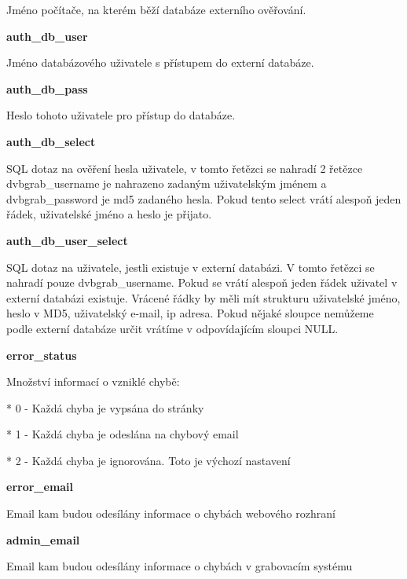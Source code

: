 Jméno počítače, na kterém běží databáze externího ověřování.

\vspace{10pt}

\textbf{auth\_db\_user}

Jméno databázového uživatele s přístupem do externí databáze.

\vspace{10pt}

\textbf{auth\_db\_pass}

Heslo tohoto uživatele pro přístup do databáze.

\vspace{10pt}

\textbf{auth\_db\_select}

SQL dotaz na ověření hesla uživatele, v tomto řetězci se nahradí 2 řetězce dvbgrab\_username je nahrazeno zadaným uživatelským jménem a dvbgrab\_password je md5 zadaného hesla. Pokud tento select vrátí alespoň jeden řádek, uživatelské jméno a heslo je přijato.

\vspace{10pt}

\textbf{auth\_db\_user\_select}

SQL dotaz na uživatele, jestli existuje v externí databázi. V tomto řetězci se nahradí pouze dvbgrab\_username. Pokud se vrátí alespoň jeden řádek uživatel v externí databázi existuje. Vrácené řádky by měli mít strukturu uživatelské jméno, heslo v MD5, uživatelský e-mail, ip adresa. Pokud nějaké sloupce nemůžeme podle externí databáze určit vrátíme v odpovídajícím sloupci NULL.

\vspace{10pt}

\textbf{error\_status}

Množství informací o vzniklé chybě:

* 0 - Každá chyba je vypsána do stránky

* 1 - Každá chyba je odeslána na chybový email

* 2 - Každá chyba je ignorována. Toto je výchozí nastavení

\vspace{10pt}

\textbf{error\_email}

Email kam budou odesílány informace o chybách webového rozhraní

\vspace{10pt}

\textbf{admin\_email}

Email kam budou odesílány informace o chybách v grabovacím systému

